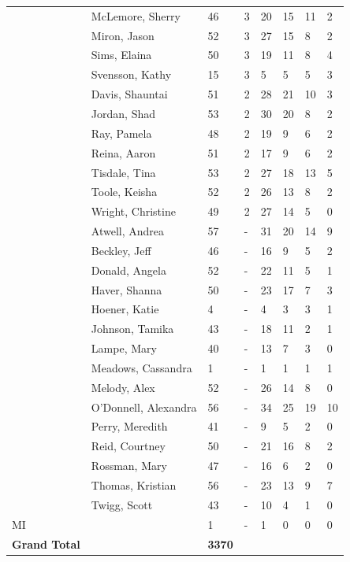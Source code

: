 \documentclass{article}\usepackage[]{graphicx}\usepackage[]{color}
\begin{document}
{\begin{longtable} { >{\raggedright}p{}p{}p{}p{}p{}p{}p{}p{}}
   \rowcolor[gray]{0.90} & McLemore, Sherry & 46 & 3 & 20 & 15 & 11 & 2 \\ 
   \rowcolor[gray]{0.90} & Miron, Jason & 52 & 3 & 27 & 15 & 8 & 2 \\ 
   \rowcolor[gray]{0.90} & Sims, Elaina & 50 & 3 & 19 & 11 & 8 & 4 \\ 
   & Svensson, Kathy & 15 & 3 & 5 & 5 & 5 & 3 \\ 
   & Davis, Shauntai & 51 & 2 & 28 & 21 & 10 & 3 \\ 
   & Jordan, Shad & 53 & 2 & 30 & 20 & 8 & 2 \\ 
   \rowcolor[gray]{0.90} & Ray, Pamela & 48 & 2 & 19 & 9 & 6 & 2 \\ 
   \rowcolor[gray]{0.90} & Reina, Aaron & 51 & 2 & 17 & 9 & 6 & 2 \\ 
   \rowcolor[gray]{0.90} & Tisdale, Tina & 53 & 2 & 27 & 18 & 13 & 5 \\ 
   & Toole, Keisha & 52 & 2 & 26 & 13 & 8 & 2 \\ 
   & Wright, Christine & 49 & 2 & 27 & 14 & 5 & 0 \\ 
   & Atwell, Andrea & 57 & - & 31 & 20 & 14 & 9 \\ 
   \rowcolor[gray]{0.90} & Beckley, Jeff & 46 & - & 16 & 9 & 5 & 2 \\ 
   \rowcolor[gray]{0.90} & Donald, Angela & 52 & - & 22 & 11 & 5 & 1 \\ 
   \rowcolor[gray]{0.90} & Haver, Shanna & 50 & - & 23 & 17 & 7 & 3 \\ 
   & Hoener, Katie & 4 & - & 4 & 3 & 3 & 1 \\ 
   & Johnson, Tamika & 43 & - & 18 & 11 & 2 & 1 \\ 
   & Lampe, Mary & 40 & - & 13 & 7 & 3 & 0 \\ 
   \rowcolor[gray]{0.90} & Meadows, Cassandra & 1 & - & 1 & 1 & 1 & 1 \\ 
   \rowcolor[gray]{0.90} & Melody, Alex & 52 & - & 26 & 14 & 8 & 0 \\ 
   \rowcolor[gray]{0.90} & O'Donnell, Alexandra & 56 & - & 34 & 25 & 19 & 10 \\ 
   & Perry, Meredith & 41 & - & 9 & 5 & 2 & 0 \\ 
   & Reid, Courtney & 50 & - & 21 & 16 & 8 & 2 \\ 
   & Rossman, Mary & 47 & - & 16 & 6 & 2 & 0 \\ 
   \rowcolor[gray]{0.90} & Thomas, Kristian & 56 & - & 23 & 13 & 9 & 7 \\ 
   \rowcolor[gray]{0.90} & Twigg, Scott & 43 & - & 10 & 4 & 1 & 0 \\ 
   \hline
MI &  & 1 & - & 1 & 0 & 0 & 0 \\ 
   \hline
\hline
\textbf{Grand Total} &  & \textbf{ 3370 } &  & {\textbf{1326} & {\textbf{776} & {\textbf{461} & {\textbf{160} \\ 
   \end{longtable}

}
\end{document}

